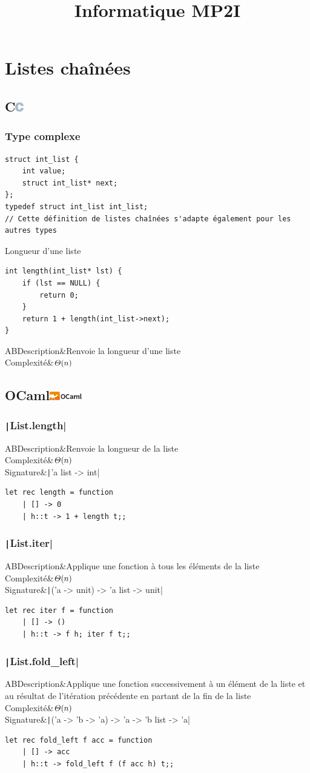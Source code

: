 \documentclass[a4paper,12pt,titlepage]{article}
\title{Informatique MP2I}
\author{}
\date{}
\renewcommand{\c}{\subsection[C]{C\hfill\protect\includegraphics[height=11pt]{C}}}
\newcommand{\ocaml}{\subsection[OCaml]{OCaml\hfill\protect\includegraphics[height=11pt]{Ocaml}}}
\let\oldsection\section
\renewcommand\section{\clearpage\oldsection}
\let\oldleft\left
\renewcommand{\left}{\mathopen{}\mathclose\bgroup\oldleft}
\let\oldright\right
\renewcommand{\right}{\aftergroup\egroup\oldright}
\newcommand{\Th}[1]{\varTheta\left(#1\right)}
\newcommand{\info}[3][]{\begin{tabularx}{\textwidth}{AB}Description&#2\\Complexité&{\ensuremath{#3}}#1\end{tabularx}}
\newcommand{\fn}[4]{\begin{fun*}{}\info[\\Signature&\texttt|#2|]{#3}{#4}\end{fun*}}
\begin{document}
\maketitle
\null\newpage
\tableofcontents
\null\newpage
{}
\section{Listes chaînées}
\c
\subsubsection{Type complexe}
\begin{tp*}{}
\begin{verbatim}
struct int_list {
    int value;
    struct int_list* next;
};
typedef struct int_list int_list;
// Cette définition de listes chaînées s'adapte également pour les autres types
\end{verbatim}
\end{tp*}
\begin{fnc*}{Longueur d'une liste}
\begin{verbatim}
int length(int_list* lst) {
    if (lst == NULL) {
        return 0;
    }
    return 1 + length(int_list->next);
}
\end{verbatim}
\info{Renvoie la longueur d'une liste}{\Th{n}}
\end{fnc*}
\ocaml
\subsubsection{\texttt|List.length|}
\fn{ocaml}{'a list -> int}{Renvoie la longueur de la liste}{\Th{n}}
\begin{imp*}{}
\begin{verbatim}
let rec length = function
    | [] -> 0
    | h::t -> 1 + length t;;
\end{verbatim}
\end{imp*}
\subsubsection{\texttt|List.iter|}
\fn{ocaml}{('a -> unit) -> 'a list -> unit}{Applique une fonction à tous les éléments de la liste}{\Th{n}}
\begin{imp*}{}
\begin{verbatim}
let rec iter f = function
    | [] -> ()
    | h::t -> f h; iter f t;;
\end{verbatim}
\end{imp*}
\subsubsection{\texttt|List.fold_left|}
\fn{ocaml}{('a -> 'b -> 'a) -> 'a -> 'b list -> 'a}{Applique une fonction successivement à un élément de la liste et au résultat de l'itération précédente en partant de la fin de la liste}{\Th{n}}
\begin{imp*}{}
\begin{verbatim}
let rec fold_left f acc = function
    | [] -> acc
    | h::t -> fold_left f (f acc h) t;;
\end{verbatim}
\end{imp*}
\end{document}

